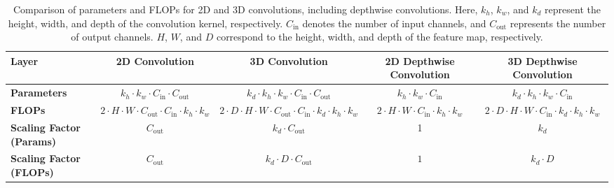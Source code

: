 \begin{table*}[t]
\scriptsize
\renewcommand\arraystretch{1.4}
\begin{center}
\begin{tabular}{|l|c|c|c|c|}
\hline
\textbf{Layer}        & \textbf{2D Convolution}                            & \textbf{3D Convolution}                              & \textbf{2D Depthwise Convolution}                   & \textbf{3D Depthwise Convolution}                   \\ \hline
\textbf{Parameters}     & $k_h \cdot k_w \cdot C_{\text{in}} \cdot C_{\text{out}}$ & $k_d \cdot k_h \cdot k_w \cdot C_{\text{in}} \cdot C_{\text{out}}$ & $k_h \cdot k_w \cdot C_{\text{in}}$    & $k_d \cdot k_h \cdot k_w \cdot C_{\text{in}}$    \\ \hline
\textbf{FLOPs}          & $ 2 \cdot H \cdot W \cdot C_{\text{out}} \cdot C_{\text{in}} \cdot k_h \cdot k_w$ & $2 \cdot D \cdot H \cdot W \cdot C_{\text{out}} \cdot C_{\text{in}} \cdot k_d \cdot k_h \cdot k_w$ & $2 \cdot H \cdot W \cdot C_{\text{in}} \cdot k_h \cdot k_w$ & $2 \cdot D \cdot H \cdot W \cdot C_{\text{in}} \cdot k_d \cdot k_h \cdot k_w$ \\ \hline
\textbf{Scaling Factor (Params)}  & $C_{\text{out}}$  & $k_d \cdot C_{\text{out}}$              & 1                                         & $k_d $      \\ \hline
\textbf{Scaling Factor (FLOPs)}   & $C_{\text{out}}$                 & $k_d \cdot D \cdot C_{\text{out}}$              & $1$                  & $k_d \cdot D$      \\ \hline
\end{tabular}
\end{center}
\caption{Comparison of parameters and FLOPs for 2D and 3D convolutions, including depthwise convolutions. Here, \(k_h\), \(k_w\), and \(k_d\) represent the height, width, and depth of the convolution kernel, respectively. \(C_{\text{in}}\) denotes the number of input channels, and \(C_{\text{out}}\) represents the number of output channels. \(H\), \(W\), and \(D\) correspond to the height, width, and depth of the feature map, respectively.}
\label{tab:conv_comparison}
\end{table*}

